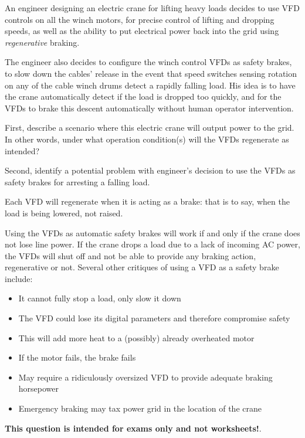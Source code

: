 

An engineer designing an electric crane for lifting heavy loads decides to use VFD controls on all the winch motors, for precise control of lifting and dropping speeds, as well as the ability to put electrical power back into the grid using {\it regenerative} braking.  

The engineer also decides to configure the winch control VFDs as safety brakes, to slow down the cables' release in the event that speed switches sensing rotation on any of the cable winch drums detect a rapidly falling load.  His idea is to have the crane automatically detect if the load is dropped too quickly, and for the VFDs to brake this descent automatically without human operator intervention.

\vskip 50pt

First, describe a scenario where this electric crane will output power to the grid.  In other words, under what operation condition(s) will the VFDs regenerate as intended?

\vskip 100pt

Second, identify a potential problem with engineer's decision to use the VFDs as safety brakes for arresting a falling load.







Each VFD will regenerate when it is acting as a brake: that is to say, when the load is being lowered, not raised.

\vskip 10pt

Using the VFDs as automatic safety brakes will work if and only if the crane does not lose line power.  If the crane drops a load due to a lack of incoming AC power, the VFDs will shut off and not be able to provide any braking action, regenerative or not.  Several other critiques of using a VFD as a safety brake include:
 
\begin{itemize}
\item{} It cannot fully stop a load, only slow it down
\item{} The VFD could lose its digital parameters and therefore compromise safety
\item{} This will add more heat to a (possibly) already overheated motor
\item{} If the motor fails, the brake fails
\item{} May require a ridiculously oversized VFD to provide adequate braking horsepower
\item{} Emergency braking may tax power grid in the location of the crane
\end{itemize}







{\bf This question is intended for exams only and not worksheets!}.



